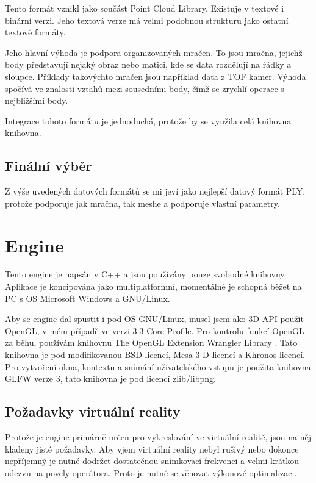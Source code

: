 Tento formát vznikl jako součást Point Cloud Library\cite{pcl}\cite{pcl_icra}. Existuje v textové i binární verzi. Jeho textová verze má velmi podobnou strukturu jako ostatní textové formáty.

Jeho hlavní výhoda je podpora organizovaných mračen. To jsou mračna, jejichž body představují nejaký obraz nebo matici, kde se data rozdělují na řádky a sloupce. Příklady takovýchto mračen jsou například data z TOF kamer. Výhoda spočívá ve znalosti vztahů mezi sousedními body, čímž se zrychlí operace s nejbližšími body.

Integrace tohoto formátu je jednoduchá, protože by se využila celá knihovna knihovna.

\subsection{Finální výběr}

Z výše uvedených datových formátů se mi jeví jako nejlepší datový formát PLY, protože podporuje jak mračna, tak meshe a podporuje vlastní parametry.

\section{Engine}

Tento engine je napsán v C++ a jsou používány pouze svobodné knihovny. Aplikace je koncipována jako multiplatformní, momentálně je schopná běžet na PC s OS Microsoft Windows a GNU/Linux.

Aby se engine dal spustit i pod OS GNU/Linux, musel jsem ako 3D API  použít OpenGL\cite{opengl}, v mém případě ve verzi 3.3 Core Profile. Pro kontrolu funkcí OpenGL za běhu, používám knihovnu The OpenGL Extension Wrangler Library \cite{glew}. Tato knihovna je pod modifikovanou BSD licencí\cite{glew-lic}, Mesa 3-D licencí\cite{mesa3d-lic} a Khronos licencí\cite{khronos-lic}.  Pro vytvoření okna, kontextu a snímání uživatelského vstupu je použita knihovna GLFW\cite{glfw3} verze 3, tato knihovna je pod licencí zlib/libpng\cite{zlib-libpng}.

\subsection{Požadavky virtuální reality}

Protože je engine primárně určen pro vykreslování ve virtuální realitě, jsou na něj kladeny jisté požadavky. Aby vjem virtuální reality nebyl rušivý nebo dokonce nepříjemný je nutné dodržet dostatečnou snímkovací frekvenci a velmi krátkou odezvu na povely operátora. Proto je nutné se věnovat výkonové optimalizaci.

